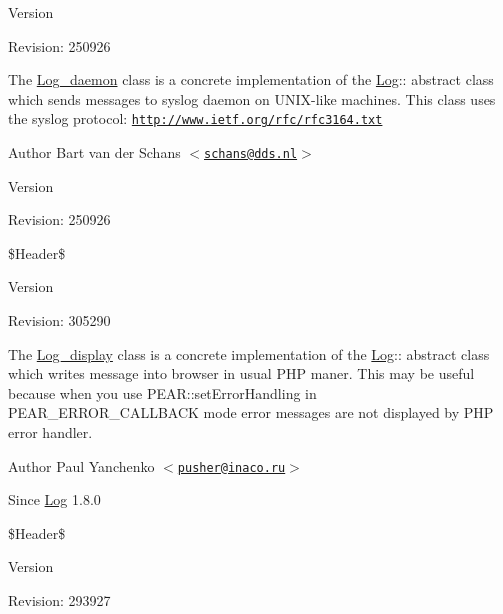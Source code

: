 \begin{DoxyVersion}{Version}

\end{DoxyVersion}
\begin{DoxyParagraph}{Revision:}
250926 
\end{DoxyParagraph}


The \hyperlink{class_log__daemon}{Log\_\-daemon} class is a concrete implementation of the \hyperlink{class_log}{Log}:: abstract class which sends messages to syslog daemon on UNIX-\/like machines. This class uses the syslog protocol: \href{http://www.ietf.org/rfc/rfc3164.txt}{\tt http://www.ietf.org/rfc/rfc3164.txt}

\begin{DoxyAuthor}{Author}
Bart van der Schans $<$\href{mailto:schans@dds.nl}{\tt schans@dds.nl}$>$ 
\end{DoxyAuthor}
\begin{DoxyVersion}{Version}

\end{DoxyVersion}
\begin{DoxyParagraph}{Revision:}
250926 
\end{DoxyParagraph}


\$Header\$

\begin{DoxyVersion}{Version}

\end{DoxyVersion}
\begin{DoxyParagraph}{Revision:}
305290 
\end{DoxyParagraph}


The \hyperlink{class_log__display}{Log\_\-display} class is a concrete implementation of the \hyperlink{class_log}{Log}:: abstract class which writes message into browser in usual PHP maner. This may be useful because when you use PEAR::setErrorHandling in PEAR\_\-ERROR\_\-CALLBACK mode error messages are not displayed by PHP error handler.

\begin{DoxyAuthor}{Author}
Paul Yanchenko $<$\href{mailto:pusher@inaco.ru}{\tt pusher@inaco.ru}$>$ 
\end{DoxyAuthor}
\begin{DoxySince}{Since}
\hyperlink{class_log}{Log} 1.8.0
\end{DoxySince}
\$Header\$

\begin{DoxyVersion}{Version}

\end{DoxyVersion}
\begin{DoxyParagraph}{Revision:}
293927 
\end{DoxyParagraph}


